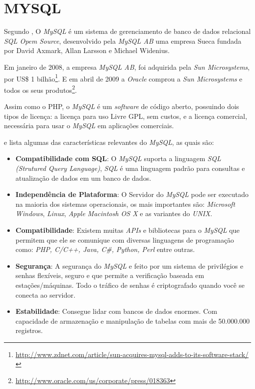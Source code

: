 \section{MYSQL}

Segundo , O \textit{MySQL} é um sistema de gerenciamento de banco de dados relacional \textit{SQL Opem Source}, desenvolvido pela \textit{MySQL AB} uma empresa Sueca fundada por David Axmark, Allan Larsson e Michael Widenius.
\par
Em janeiro de 2008, a empresa \textit{MySQL AB}, foi adquirida pela \textit{Sun Microsystems}, por US\$ 1 bilhão\footnote{\url{http://www.zdnet.com/article/sun-acquires-mysql-adds-to-its-software-stack/}}. E em abril de 2009 a \textit{Oracle} comprou a \textit{Sun Microsystems} e todos os seus produtos\footnote{\url{http://www.oracle.com/us/corporate/press/018363}}.
\par
Assim como o PHP, o \textit{MySQL} é um \textit{software} de código aberto, possuindo dois tipos de licença: a licença para uso Livre \ac{GPL}, sem custos, e a licença comercial, necessária para usar o \textit{MySQL} em aplicações comerciais.
\par
{} e  lista algumas das características relevantes do \textit{MySQL}, as quais são:
\begin{itemize}
    \item \textbf{Compatibilidade com SQL}: O \textit{MySQL} suporta a linguagem \textit{SQL (Strutured Query Language)}, \textit{SQL} é uma linguagem padrão para consultas e atualização de dados em um banco de dados.
    \item \textbf{Independência de Plataforma}: O Servidor do \textit{MySQL} pode ser executado na maioria dos sistemas operacionais, os mais importantes são: \textit{Microsoft Windows}, \textit{Linux}, \textit{Apple Macintosh OS X} e as variantes do \textit{UNIX}.
    \item \textbf{Compatibilidade}: Existem muitas \textit{APIs} e bibliotecas para o \textit{MySQL} que permitem que ele se comunique com diversas linguagens de programação como: \textit{PHP, C/C++, Java, C\#, Python, Perl} entre outras.
    \item \textbf{Segurança}: A segurança do \textit{MySQL} e feito por um sistema de privilégios e senhas flexíveis, seguro e que permite a verificação baseada em estações/máquinas. Todo o tráfico de senhas é criptografado quando você se conecta ao servidor.
    \item \textbf{Estabilidade}: Consegue lidar com bancos de dados enormes. Com capacidade de armazenação e manipulação de tabelas com mais de 50.000.000 registros. 
\end{itemize}




